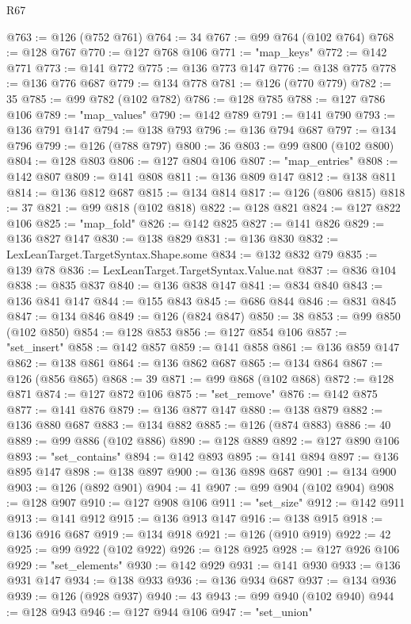 \begin{lexlean}{R67}
\begin{coremodule}
@763 := @126 (@752 @761)
@764 := 34
@767 := @99 @764 (@102 @764)
@768 := @128 @767
@770 := @127 @768 @106
@771 := "map_keys"
@772 := @142 @771
@773 := @141 @772
@775 := @136 @773 @147
@776 := @138 @775
@778 := @136 @776 @687
@779 := @134 @778
@781 := @126 (@770 @779)
@782 := 35
@785 := @99 @782 (@102 @782)
@786 := @128 @785
@788 := @127 @786 @106
@789 := "map_values"
@790 := @142 @789
@791 := @141 @790
@793 := @136 @791 @147
@794 := @138 @793
@796 := @136 @794 @687
@797 := @134 @796
@799 := @126 (@788 @797)
@800 := 36
@803 := @99 @800 (@102 @800)
@804 := @128 @803
@806 := @127 @804 @106
@807 := "map_entries"
@808 := @142 @807
@809 := @141 @808
@811 := @136 @809 @147
@812 := @138 @811
@814 := @136 @812 @687
@815 := @134 @814
@817 := @126 (@806 @815)
@818 := 37
@821 := @99 @818 (@102 @818)
@822 := @128 @821
@824 := @127 @822 @106
@825 := "map_fold"
@826 := @142 @825
@827 := @141 @826
@829 := @136 @827 @147
@830 := @138 @829
@831 := @136 @830
@832 := LexLeanTarget.TargetSyntax.Shape.some
@834 := @132 @832 @79
@835 := @139 @78
@836 := LexLeanTarget.TargetSyntax.Value.nat
@837 := @836 @104
@838 := @835 @837
@840 := @136 @838 @147
@841 := @834 @840
@843 := @136 @841 @147
@844 := @155 @843
@845 := @686 @844
@846 := @831 @845
@847 := @134 @846
@849 := @126 (@824 @847)
@850 := 38
@853 := @99 @850 (@102 @850)
@854 := @128 @853
@856 := @127 @854 @106
@857 := "set_insert"
@858 := @142 @857
@859 := @141 @858
@861 := @136 @859 @147
@862 := @138 @861
@864 := @136 @862 @687
@865 := @134 @864
@867 := @126 (@856 @865)
@868 := 39
@871 := @99 @868 (@102 @868)
@872 := @128 @871
@874 := @127 @872 @106
@875 := "set_remove"
@876 := @142 @875
@877 := @141 @876
@879 := @136 @877 @147
@880 := @138 @879
@882 := @136 @880 @687
@883 := @134 @882
@885 := @126 (@874 @883)
@886 := 40
@889 := @99 @886 (@102 @886)
@890 := @128 @889
@892 := @127 @890 @106
@893 := "set_contains"
@894 := @142 @893
@895 := @141 @894
@897 := @136 @895 @147
@898 := @138 @897
@900 := @136 @898 @687
@901 := @134 @900
@903 := @126 (@892 @901)
@904 := 41
@907 := @99 @904 (@102 @904)
@908 := @128 @907
@910 := @127 @908 @106
@911 := "set_size"
@912 := @142 @911
@913 := @141 @912
@915 := @136 @913 @147
@916 := @138 @915
@918 := @136 @916 @687
@919 := @134 @918
@921 := @126 (@910 @919)
@922 := 42
@925 := @99 @922 (@102 @922)
@926 := @128 @925
@928 := @127 @926 @106
@929 := "set_elements"
@930 := @142 @929
@931 := @141 @930
@933 := @136 @931 @147
@934 := @138 @933
@936 := @136 @934 @687
@937 := @134 @936
@939 := @126 (@928 @937)
@940 := 43
@943 := @99 @940 (@102 @940)
@944 := @128 @943
@946 := @127 @944 @106
@947 := "set_union"

\end{coremodule}
\end{lexlean}
